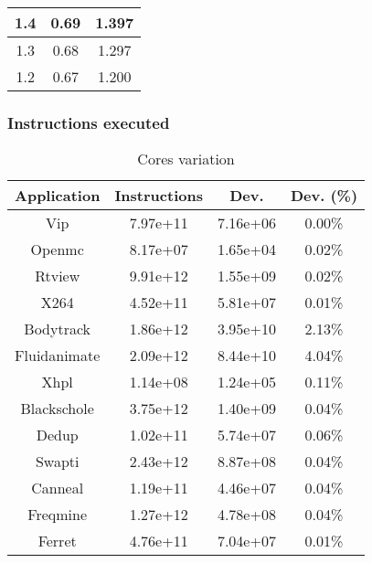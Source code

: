 \documentclass{ieeeaccess}
\begin{document}
\begin{table}[H]
\begin{tabular}{|c|c|c|}
1.4                                                     & 0.69  & 1.397                                                     \\ \hline
1.3                                                     & 0.68  & 1.297                                                     \\ \hline
1.2                                                     & 0.67  & 1.200                                                     \\ \hline
\end{tabular}
\end{table}

\subsubsection{Instructions executed}

\begin{table}[H]
\caption{Cores variation}
\begin{tabular}{|c|c|c|c|}
\hline
Application  & Instructions & Dev.     & Dev. (\%) \\ \hline
Vip          & 7.97e+11     & 7.16e+06 & 0.00\%    \\ \hline
Openmc       & 8.17e+07     & 1.65e+04 & 0.02\%    \\ \hline
Rtview       & 9.91e+12     & 1.55e+09 & 0.02\%    \\ \hline
X264         & 4.52e+11     & 5.81e+07 & 0.01\%    \\ \hline
Bodytrack    & 1.86e+12     & 3.95e+10 & 2.13\%    \\ \hline
Fluidanimate & 2.09e+12     & 8.44e+10 & 4.04\%    \\ \hline
Xhpl         & 1.14e+08     & 1.24e+05 & 0.11\%    \\ \hline
Blackschole  & 3.75e+12     & 1.40e+09 & 0.04\%    \\ \hline
Dedup        & 1.02e+11     & 5.74e+07 & 0.06\%    \\ \hline
Swapti       & 2.43e+12     & 8.87e+08 & 0.04\%    \\ \hline
Canneal      & 1.19e+11     & 4.46e+07 & 0.04\%    \\ \hline
Freqmine     & 1.27e+12     & 4.78e+08 & 0.04\%    \\ \hline
Ferret       & 4.76e+11     & 7.04e+07 & 0.01\%    \\ \hline
\end{tabular}
\end{table}
\end{document}
